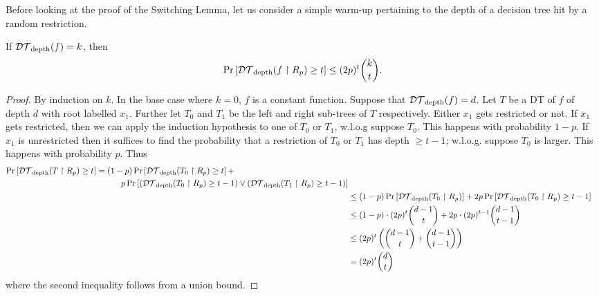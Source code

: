 \documentclass[11pt]{article}
\begin{document}
	Before looking at the proof of the Switching Lemma, let us consider a simple warm-up pertaining to the depth of a decision tree hit by a random restriction. 
	\begin{theorem}
		If $\mathcal{DT}_{\mathrm{depth}}(f) = k$, then 
		\[\Pr\left[\mathcal{DT}_{\mathrm{depth}}(f \upharpoonright R_p) \geq t\right] \leq (2p)^t \binom{k}{t}.\]
	\end{theorem}
	\begin{proof}
		By induction on $k$. In the base case where $k = 0$, $f$ is a constant function. Suppose that $\mathcal{DT}_{\mathrm{depth}}(f) = d$. Let $T$ be a DT of $f$ of depth $d$ with root labelled $x_1$. Further let $T_0$ and $T_1$ be the left and right sub-trees of $T$ respectively. Either $x_1$ gets restricted or not. If $x_1$ gets restricted, then we can apply the induction hypothesis to one of $T_0$ or $T_1$, w.l.o.g suppose $T_0$. This happens with probability $1 - p$. If $x_1$ is unrestricted then it suffices to find the probability that a restriction of $T_0$ or $T_1$ has depth $\geq t-1$; w.l.o.g. suppose $T_0$ is larger. This happens with probability $p$. Thus 
		\begin{align*}
			\begin{split}
				\Pr\left[\mathcal{DT}_{\mathrm{depth}}(T \upharpoonright R_p) \geq t\right] &= (1-p)\Pr\left[\mathcal{DT}_{\mathrm{depth}}(T_0 \upharpoonright R_p) \geq t\right]+\\ & \qquad\quad p\Pr\left[\left(\mathcal{DT}_{\mathrm{depth}}(T_0 \upharpoonright R_p) \geq t-1\right) \lor \left(\mathcal{DT}_{\mathrm{depth}}(T_1 \upharpoonright R_p) \geq t-1\right)\right]
			\end{split}
			\\
			&\leq (1-p)\Pr\left[\mathcal{DT}_{\mathrm{depth}}(T_0 \upharpoonright R_p)\right] + 2p\Pr\left[\mathcal{DT}_{\mathrm{depth}}(T_0 \upharpoonright R_p) \geq t-1\right]\\
			&\leq (1-p)\cdot(2p)^{t}\binom{d-1}{t} + 2p\cdot(2p)^{t-1}\binom{d-1}{t-1}\\
			&\leq (2p)^{t}\left(\binom{d-1}{t} + \binom{d-1}{t-1}\right)\\
			&= (2p)^{t}\binom{d}{t}
		\end{align*}
		where the second inequality follows from a union bound.
	\end{proof}
	
\end{document}
